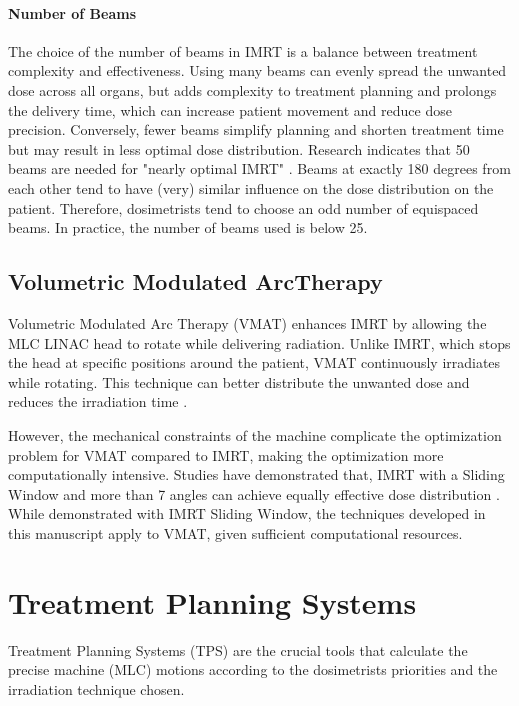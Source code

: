 
\paragraph{Number of Beams}
The choice of the number of beams in IMRT is a balance between treatment complexity and effectiveness.
Using many beams can evenly spread the unwanted dose across all organs, but adds complexity to treatment planning and prolongs the delivery time, which can increase patient movement and reduce dose precision.
Conversely, fewer beams simplify planning and shorten treatment time but may result in less optimal dose distribution.
Research indicates that 50 beams are needed for "nearly optimal IMRT" \cite{Fenwick2011}.
Beams at exactly 180 degrees from each other tend to have (very) similar influence on the dose distribution on the patient.
Therefore, dosimetrists tend to choose an odd number of equispaced beams.
In practice, the number of beams used is below 25.


\subsection[VMAT]{Volumetric Modulated ArcTherapy}
Volumetric Modulated Arc Therapy (VMAT) enhances IMRT by allowing the MLC LINAC head to rotate while delivering radiation.
Unlike IMRT, which stops the head at specific positions around the patient, VMAT continuously irradiates while rotating.
This technique can better distribute the unwanted dose and reduces the irradiation time \cite{Hardcastle2011}.


However, the mechanical constraints of the machine complicate the optimization problem for VMAT compared to IMRT, making the optimization more computationally intensive.
Studies have demonstrated that, IMRT with a Sliding Window and more than 7 angles can achieve equally effective dose distribution \cite{Bortfeld2010} \cite{Quan2012}.
While demonstrated with IMRT Sliding Window, the techniques developed in this manuscript apply to VMAT, given sufficient computational resources.


\section{Treatment Planning Systems}
Treatment Planning Systems (TPS) are the crucial tools that calculate the precise machine (MLC) motions according to the dosimetrists priorities and the irradiation technique chosen.

